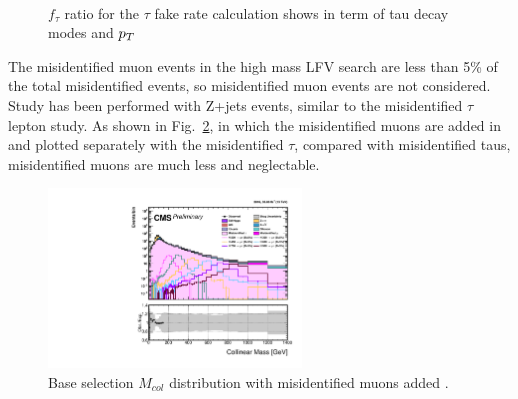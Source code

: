 \documentclass[final,numrefs,sort&compress,twoadvisors]{nddiss2e}
\begin{document}
\begin{figure}[htbp] 
     \centering
      \\
     \caption{$f_{\tau}$ ratio for the $\tau$ fake rate calculation shows in term of tau decay modes and $p_{T}$}
     \label{fig:fakerationumber}
\end{figure}

The misidentified muon events in the high mass LFV search are less than 5\% of the total misidentified events, so misidentified muon events are not considered. Study has been performed with Z+jets events, similar to the misidentified $\tau$ lepton study. As shown in Fig.~\ref{fig:MisidentifiedMuon}, in which the misidentified muons are added in and plotted separately with the misidentified $\tau$, compared with misidentified taus, misidentified muons are much less and  neglectable. 

\begin{figure}[htbp] 
\centering
\includegraphics[width=0.6\textwidth]{chapterfakerate/LFV_preselection_collMass_type1_200Fakes_PoissonErrorsMuonfake.pdf}
\caption{Base selection $M_{col}$ distribution with misidentified muons added .}
\label{fig:MisidentifiedMuon}
\end{figure}
\end{document}
